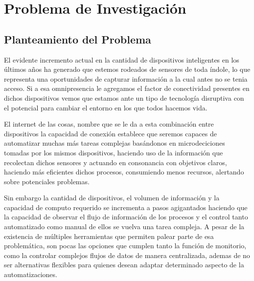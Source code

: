 

\chapter{Problema de Investigación}

\section{Planteamiento del Problema}
El evidente incremento actual en la cantidad de dispositivos inteligentes en los últimos años ha generado que estemos rodeados de sensores de toda índole, lo que representa una oportunidades de capturar información a la cual antes no se tenia acceso. Si a esa omnipresencia le agregamos el factor de conectividad presentes en dichos dispositivos vemos que estamos ante un tipo de tecnología disruptiva con el potencial para cambiar el entorno en los que todos hacemos vida. 

El internet de las cosas, nombre que se le da a esta combinación entre dispositivos la capacidad de conexión establece que seremos capaces de automatizar muchas más tareas complejas basándonos en microdeciciones tomadas por los mismos dispositivos, haciendo uso de la información que recolectan dichos sensores y actuando en consonancia con objetivos claros, haciendo más eficientes dichos procesos, consumiendo menos recursos, alertando sobre potenciales problemas. 

Sin embargo la cantidad de dispositivos, el volumen de información y la capacidad de computo requerido se incrementa a pasos agigantados haciendo que la capacidad de observar el flujo de información de los procesos y el control tanto automatizado como manual de ellos se vuelva una tarea compleja. A pesar de la existencia de múltiples herramientas que permiten palear parte de esa problemática, son pocas las opciones que cumplen tanto la función de monitorio, como la controlar complejos flujos de datos de manera centralizada, ademas de no ser alternativas flexibles para quienes desean adaptar determinado aspecto de la automatizaciones. 

